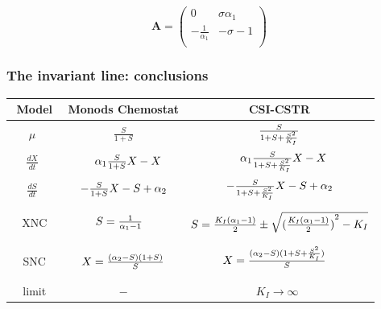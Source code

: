 \documentclass[a4paper, 10pt, twoside, openright]{book}
\begin{document}
\begin{displaymath}
\mathbf{A} =
\left( \begin{array}{cc}
0 &  \sigma {\alpha}_{1}  \\
 - \frac{1}{{\alpha}_{1}} & -\sigma - 1 \\
\end{array}\right)
\end{displaymath}

\subsubsection*{The invariant line: conclusions}






\begin{tabular}{|c|c|c|} \hline %
$\phantom{\Bigg(}$Model$\phantom{\Bigg(}$ & Monods Chemostat & CSI-CSTR \\ 
\hline %
$\mu\phantom{\Bigg(}$
& $\frac{ S} {1+S}$
& $\frac{ S} {1+S+\frac{{S}^{2}}{{K}_{I}}}$ \\ %
$\frac{dX}{dt} \phantom{\Bigg(}$ 
& $\phantom{-}{\alpha}_{1}\frac{ S}{1+S}X-X$        
& $\phantom{-}{\alpha}_{1}\frac{ S}{1+S+\frac{{S}^{2}}{{K}_{I}}}X-X $  \\
$\frac{dS}{dt} \phantom{\Bigg)}$ 
& $-\frac{S} {1+S}X-S+{\alpha}_{2} $        
& $-\frac{S} {1+S+\frac{{S}^{2}}{{K}_{I}}}X-S+{\alpha}_{2}$        \\ %
XNC%
& $S=\frac{1}{{\alpha}_{1} - 1} \phantom{\Bigg(}$
& $S=\frac{{K}_{I}({\alpha}_{1}-1)}{2}\pm\sqrt{{(\frac{{K}_{I}({\alpha}_{1}-1)}{2})}^{2}-{K}_{I}}$ \\
SNC%
& $ X= \frac{ ({\alpha}_{2}-S)(1+S) }  { S }$ 
& $ X=
\frac{({\alpha}_{2}-S)(1+S+\frac{{S}^{2}}{{K}_{I}})}{S}\phantom{\Bigg(} $\\ 
limit%
& $-$
& $ K_I \rightarrow \infty\phantom{\Bigg(}$  \\ \hline 
\end{tabular}
\end{document}
